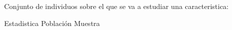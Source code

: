 
\question Conjunto de individuos sobre el que se va a estudiar una
          caracteristica:

  \begin{oneparchoices}
    \choice Estadistica
    \CorrectChoice Población
    \choice Muestra
  \end{oneparchoices}
